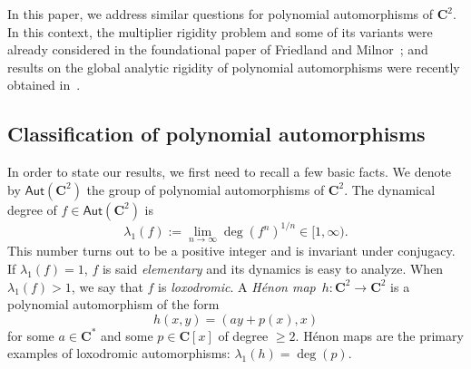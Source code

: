 \documentclass[oneside, 12pt]{amsart}
\newcommand{\C}{\mathbf{C}}
\newcommand{\Aut}{\mathsf{Aut}}
\theoremstyle{plain}
\theoremstyle{definition}
\numberwithin{equation}{section}       %
\numberwithin{equation}{section}       %
\begin{document}
 In this paper, we address similar questions for polynomial automorphisms of $\C^2$. 
 In this context, the multiplier rigidity problem and some of its variants
were already considered in the foundational paper of  Friedland and Milnor~\cite{friedland-milnor};  
and results on the global analytic rigidity of polynomial automorphisms 
 were recently obtained in~\cite{bera-verma, conjugate, rigidity}.

 

 
\subsection{Classification of polynomial automorphisms}\label{subs:fm}
In order to state our results, we first need to recall a few basic facts. 
We denote by $\Aut(\C^2)$ the group of polynomial automorphisms of $\C^2$. 
The dynamical degree of $f\in \Aut(\C^2)$ is 
\begin{equation}
\lambda_1(f) :=\lim_{n\to \infty}\deg(f^n)^{1/n}\in[1, \infty).
\end{equation}
This number turns out to be a positive integer   and is invariant under conjugacy.
If $\lambda_1(f)=1$, $f$ is said \emph{elementary} and its dynamics is easy to analyze. 
When $\lambda_1(f)>1$,  we say that $f$ is \emph{loxodromic}. A  %
 {\emph{Hénon map}} $h\colon \C^2\to \C^2$ is a polynomial automorphism of the form
 \begin{equation}
 h(x,y) = (a y+p(x), x)
 \end{equation}
 for some $a\in \C^*$ and some $p\in \C[x]$ of degree $\geq 2$. Hénon maps are the primary examples of loxodromic automorphisms: $\lambda_1(h)=\deg(p)$.
\end{document}
